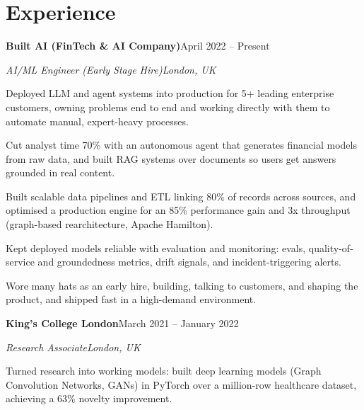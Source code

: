 \documentclass[10pt,a4paper]{article}
\newcommand{\entry}[4]{%
  {\color{company}\bfseries #1}\hfill {\color{muted}#2}\par
  \vspace{1pt}
  {\itshape #3}\hfill {\color{muted}\itshape #4}\par
  \vspace{3pt}%
}
\begin{document}
\section{Experience}
\entry{Built AI (FinTech \& AI Company)}{April 2022 -- Present}{AI/ML Engineer (Early Stage Hire)}{London, UK}
\begin{tight}
  \item Deployed LLM and agent systems into production for 5+ leading enterprise customers, owning problems end to end and working directly with them to automate manual, expert-heavy processes.
  \item Cut analyst time 70\% with an autonomous agent that generates financial models from raw data, and built RAG systems over documents so users get answers grounded in real content.
  \item Built scalable data pipelines and ETL linking 80\% of records across sources, and optimised a production engine for an 85\% performance gain and 3x throughput (graph-based rearchitecture, Apache Hamilton).
  \item Kept deployed models reliable with evaluation and monitoring: evals, quality-of-service and groundedness metrics, drift signals, and incident-triggering alerts.
  \item Wore many hats as an early hire, building, talking to customers, and shaping the product, and shipped fast in a high-demand environment.
\end{tight}

\entry{King's College London}{March 2021 -- January 2022}{Research Associate}{London, UK}
\begin{tight}
  \item Turned research into working models: built deep learning models (Graph Convolution Networks, GANs) in PyTorch over a million-row healthcare dataset, achieving a 63\% novelty improvement.
\end{tight}

\end{document}
